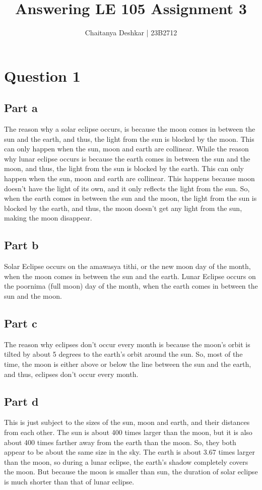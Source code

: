 \documentclass{article}
\title{Answering LE 105 Assignment 3}
\author{Chaitanya Deshkar | 23B2712}
\begin{document}
\maketitle

\section*{Question 1}
\subsection*{Part a}
The reason why a solar eclipse occurs, is because the moon comes in between the sun and the earth, and thus, the light from the sun is blocked by the moon. This can only happen when the sun, moon and earth are collinear. 
\newline
While the reason why lunar eclipse occurs is because the earth comes in between the sun and the moon, and thus, the light from the sun is blocked by the earth. This can only happen when the sun, moon and earth are collinear. This happens because
moon doesn't have the light of its own, and it only reflects the light from the sun. So, when the earth comes in between the sun and the moon, the light from the sun is blocked by the earth, and thus, the moon doesn't get any light from the sun, making the moon disappear.
\subsection*{Part b}
Solar Eclipse occurs on the amawasya tithi, or the new moon day of the month, when the moon comes in between the sun and the earth. Lunar Eclipse occurs on the poornima (full moon) day of the month, when the earth comes in between the sun and the moon.
\subsection*{Part c}
The reason why eclipses don't occur every month is because the moon's orbit is tilted by about 5 degrees to the earth's orbit around the sun. So, most of the time, the moon is either above or below the line between the sun and the earth, and thus, eclipses don't occur every month.
\subsection*{Part d}
This is just subject to the sizes of the sun, moon and earth, and their distances from each other. The sun is about 400 times larger than the moon, but it is also about 400 times farther away from the earth than the moon. So, they both appear to be about the same size in the sky. The earth is about 3.67 times larger than the moon, so during a lunar eclipse, the earth's shadow completely covers the moon. But because the moon is smaller than sun, the duration of solar eclipse is much shorter than that of lunar eclipse.
\newline
\end{document}
